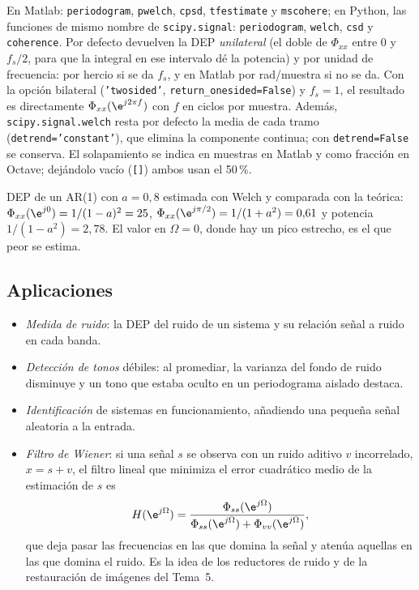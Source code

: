 \documentclass[11pt,a4paper]{scrartcl}
\begin{document}
En Matlab: \texttt{periodogram}, \texttt{pwelch}, \texttt{cpsd}, \texttt{tfestimate} y \texttt{mscohere}; en Python, las funciones de mismo nombre de \texttt{scipy.signal}: \texttt{periodogram}, \texttt{welch}, \texttt{csd} y \texttt{coherence}. Por defecto devuelven la DEP \emph{unilateral} (el doble de $\Phi_{xx}$ entre 0 y $f_s/2$, para que la integral en ese intervalo dé la potencia) y por unidad de frecuencia: por hercio si se da $f_s$, y en Matlab por rad/muestra si no se da. Con la opción bilateral (\texttt{'twosided'}, \texttt{return\_onesided=False}) y $f_s=1$, el resultado es directamente $\Phi_{xx}(\e^{j2\pi f})$ con $f$ en ciclos por muestra. Además, \texttt{scipy.signal.welch} resta por defecto la media de cada tramo (\texttt{detrend='constant'}), que elimina la componente continua; con \texttt{detrend=False} se conserva. El solapamiento se indica en muestras en Matlab y como fracción en Octave; dejándolo vacío (\texttt{[]}) ambos usan el 50\,\%.

\begin{encodigo}
  DEP de un AR(1) con $a=0{,}8$ estimada con Welch y comparada con la teórica: $\Phi_{xx}(\e^{j0})=1/(1-a)^2=25$, $\Phi_{xx}(\e^{j\pi/2})=1/(1+a^2)=0{,}61$ y potencia $1/(1-a^2)=2{,}78$. El valor en $\Omega=0$, donde hay un pico estrecho, es el que peor se estima.
\end{encodigo}

\subsection{Aplicaciones}

\begin{itemize}
  \item \emph{Medida de ruido}: la DEP del ruido de un sistema y su relación señal a ruido en cada banda.
  \item \emph{Detección de tonos} débiles: al promediar, la varianza del fondo de ruido disminuye y un tono que estaba oculto en un periodograma aislado destaca.
  \item \emph{Identificación} de sistemas en funcionamiento, añadiendo una pequeña señal aleatoria a la entrada.
  \item \emph{Filtro de Wiener}: si una señal $s$ se observa con un ruido aditivo $v$ incorrelado, $x=s+v$, el filtro lineal que minimiza el error cuadrático medio de la estimación de $s$ es
  \[
    H(\e^{j\Omega})=\frac{\Phi_{ss}(\e^{j\Omega})}{\Phi_{ss}(\e^{j\Omega})+\Phi_{vv}(\e^{j\Omega})},
  \]
  que deja pasar las frecuencias en las que domina la señal y atenúa aquellas en las que domina el ruido. Es la idea de los reductores de ruido y de la restauración de imágenes del Tema~5.
\end{itemize}
\end{document}
